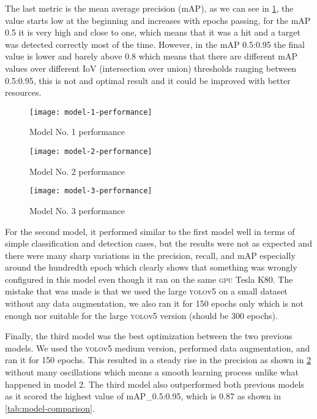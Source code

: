 \documentclass[../main.tex]{subfiles}
\begin{document}
The last metric is the mean average precision (mAP), as we can see in 
\cref{fig:model-1-performance}, the value starts low at the beginning and 
increases with epochs passing, for the mAP 0.5 it is very high and close
to one, which means that it was a hit and a target was detected 
correctly most of the time. However, in the mAP 0.5:0.95 the final value 
is lower and barely above 0.8 which means that there are different mAP 
values over different IoV (intersection over union) thresholds ranging 
between 0.5:0.95, this is not and optimal result and it could be improved 
with better resources.

\begin{figure}[tbp] 
	\centering
	\texttt{[image: model-1-performance]} 
	\caption{Model No. 1 performance} \label{fig:model-1-performance} 
\end{figure}

\begin{figure}[tbp] 
	\centering
	\texttt{[image: model-2-performance]} 
	\caption{Model No. 2 performance} \label{fig:model-2-performance} 
\end{figure}

\begin{figure}[tbp] 
	\centering
	\texttt{[image: model-3-performance]} 
	\caption{Model No. 3 performance} \label{fig:model-3-performance} 
\end{figure}

For the second model, it performed similar to the first model well in terms of simple 
classification and detection cases, but the results were not as expected and there 
were many sharp variations in the precision, recall, and mAP especially around the 
hundredth epoch which clearly shows that something was wrongly configured in this model
even though it ran on the same \textsc{gpu} Tesla K80.
The mistake that was made is that we used the large \textsc{yolo}v5 on a small dataset
without any data augmentation, we also ran it for 150 epochs only which is not enough nor 
suitable for the large \textsc{yolo}v5 version (should be 300 epochs).

Finally, the third model was the best optimization between the two previous models. 
We used the \textsc{yolo}v5 medium version, performed data augmentation, and ran it for
150 epochs. This resulted in a steady rise in the precision as shown in 
\cref{fig:model-2-performance} without many oscillations which means a smooth learning
process unlike what happened in model 2. 
The third model also outperformed both previous models as it scored the highest value 
of mAP\_0.5:0.95, which is 0.87 as shown in \cref{tab:model-comparison}. 
\end{document}
